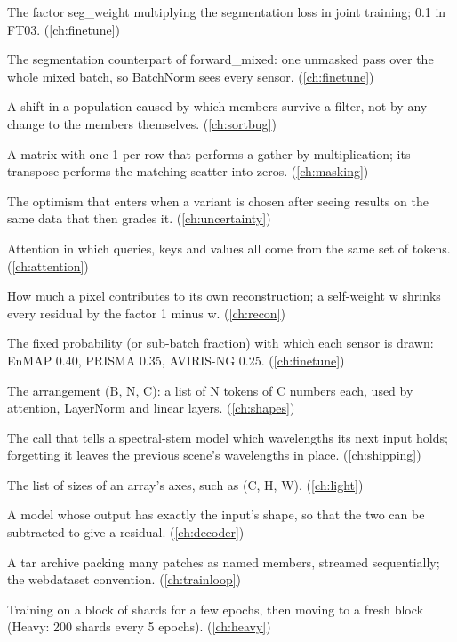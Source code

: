\begin{description}[style=nextline,leftmargin=1.2em,font=\normalfont\bfseries]
\item[Segmentation weight] The factor seg\_weight multiplying the segmentation loss in joint training; 0.1 in FT03. (\cref{ch:finetune})
\item[segment\_mixed] The segmentation counterpart of forward\_mixed: one unmasked pass over the whole mixed batch, so BatchNorm sees every sensor. (\cref{ch:finetune})
\item[Selection effect] A shift in a population caused by which members survive a filter, not by any change to the members themselves. (\cref{ch:sortbug})
\item[Selection matrix] A matrix with one 1 per row that performs a gather by multiplication; its transpose performs the matching scatter into zeros. (\cref{ch:masking})
\item[Selection risk] The optimism that enters when a variant is chosen after seeing results on the same data that then grades it. (\cref{ch:uncertainty})
\item[Self-attention] Attention in which queries, keys and values all come from the same set of tokens. (\cref{ch:attention})
\item[Self-weight] How much a pixel contributes to its own reconstruction; a self-weight w shrinks every residual by the factor 1 minus w. (\cref{ch:recon})
\item[Sensor share] The fixed probability (or sub-batch fraction) with which each sensor is drawn: EnMAP 0.40, PRISMA 0.35, AVIRIS-NG 0.25. (\cref{ch:finetune})
\item[Sequence layout] The arrangement (B, N, C): a list of N tokens of C numbers each, used by attention, LayerNorm and linear layers. (\cref{ch:shapes})
\item[set\_wavelengths] The call that tells a spectral-stem model which wavelengths its next input holds; forgetting it leaves the previous scene's wavelengths in place. (\cref{ch:shipping})
\item[Shape] The list of sizes of an array's axes, such as (C, H, W). (\cref{ch:light})
\item[Shape-preserving model] A model whose output has exactly the input's shape, so that the two can be subtracted to give a residual. (\cref{ch:decoder})
\item[Shard] A tar archive packing many patches as named members, streamed sequentially; the webdataset convention. (\cref{ch:trainloop})
\item[Shard rotation] Training on a block of shards for a few epochs, then moving to a fresh block (Heavy: 200 shards every 5 epochs). (\cref{ch:heavy})

\end{description}
